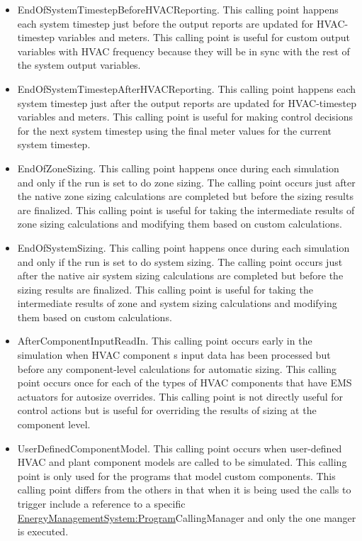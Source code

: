 \begin{itemize}
\item
  EndOfSystemTimestepBeforeHVACReporting. This calling point happens each system timestep just before the output reports are updated for HVAC-timestep variables and meters. This calling point is useful for custom output variables with HVAC frequency because they will be in sync with the rest of the system output variables.
\item
  EndOfSystemTimestepAfterHVACReporting. This calling point happens each system timestep just after the output reports are updated for HVAC-timestep variables and meters. This calling point is useful for making control decisions for the next system timestep using the final meter values for the current system timestep.
\item
  EndOfZoneSizing. This calling point happens once during each simulation and only if the run is set to do zone sizing. The calling point occurs just after the native zone sizing calculations are completed but before the sizing results are finalized. This calling point is useful for taking the intermediate results of zone sizing calculations and modifying them based on custom calculations.
\item
  EndOfSystemSizing. This calling point happens once during each simulation and only if the run is set to do system sizing. The calling point occurs just after the native air system sizing calculations are completed but before the sizing results are finalized. This calling point is useful for taking the intermediate results of zone and system sizing calculations and modifying them based on custom calculations.
\item
  AfterComponentInputReadIn. This calling point occurs early in the simulation when HVAC component s input data has been processed but before any component-level calculations for automatic sizing. This calling point occurs once for each of the types of HVAC components that have EMS actuators for autosize overrides. This calling point is not directly useful for control actions but is useful for overriding the results of sizing at the component level.
\item
  UserDefinedComponentModel. This calling point occurs when user-defined HVAC and plant component models are called to be simulated. This calling point is only used for the programs that model custom components. This calling point differs from the others in that when it is being used the calls to trigger include a reference to a specific \hyperref[energymanagementsystemprogram]{EnergyManagementSystem:Program}CallingManager and only the one manger is executed.

\end{itemize}
